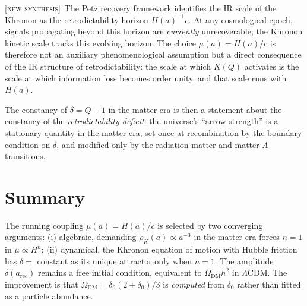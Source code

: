 \documentclass[prd,twocolumn,superscriptaddress,longbibliography,floatfix]{revtex4-2}
\newcommand{\OmegaDM}{\Omega_{\mathrm{DM}}}
\newcommand{\new}{\textsc{[new synthesis]}}
\begin{document}
\new\ The Petz recovery framework
\cite{Huang2025paper1} identifies the IR scale of the
Khronon as the retrodictability horizon $H(a)^{-1}c$.
At any cosmological epoch, signals propagating beyond
this horizon are \emph{currently} unrecoverable; the
Khronon kinetic scale tracks this evolving horizon.
The choice $\mu(a) = H(a)/c$ is therefore not an
auxiliary phenomenological assumption but a direct
consequence of the IR structure of retrodictability:
the scale at which $K(Q)$ activates is the scale at
which information loss becomes order unity, and that
scale runs with $H(a)$.

The constancy of $\delta = Q - 1$ in the matter era is
then a statement about the constancy of the
\emph{retrodictability deficit}: the universe's
``arrow strength'' is a stationary quantity in the
matter era, set once at recombination by the
boundary condition on $\delta$, and modified only by
the radiation-matter and matter-$\Lambda$ transitions.

\section{Summary}
\label{sec:summary}

The running coupling $\mu(a) = H(a)/c$ is selected by
two converging arguments:
(i) algebraic, demanding $\rho_{K}(a) \propto a^{-3}$
in the matter era forces $n = 1$ in
$\mu \propto H^{n}$;
(ii) dynamical, the Khronon equation of motion with
Hubble friction has $\delta = $ constant as its
unique attractor only when $n = 1$.
The amplitude $\delta(a_{\mathrm{rec}})$ remains a
free initial condition, equivalent to
$\OmegaDM h^{2}$ in $\Lambda$CDM.  The improvement is
that $\OmegaDM = \delta_{0}(2+\delta_{0})/3$ is
\emph{computed} from $\delta_{0}$ rather than fitted
as a particle abundance.
\end{document}
